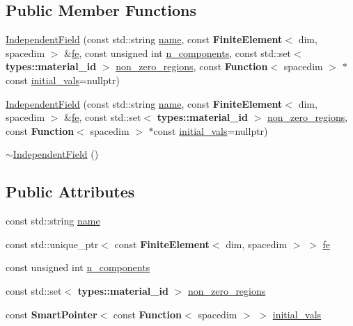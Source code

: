 \subsection*{Public Member Functions}
\begin{DoxyCompactItemize}
\item 
\hyperlink{class_independent_field_a03c2bec3886170c288c59381886afd90}{Independent\+Field} (const std\+::string \hyperlink{class_independent_field_ae05f8565e4ce1a70b5b833555dc084b5}{name}, const {\bf Finite\+Element}$<$ dim, spacedim $>$ \&\hyperlink{class_independent_field_a1c583665b7710bd3b815b03ba026b6d3}{fe}, const unsigned int \hyperlink{class_independent_field_a7b19ea8c30d72cf27f05669de61f30a8}{n\+\_\+components}, const std\+::set$<$ {\bf types\+::material\+\_\+id} $>$ \hyperlink{class_independent_field_a4e09e114870c0b3761bc2e32916e5850}{non\+\_\+zero\+\_\+regions}, const {\bf Function}$<$ spacedim $>$ $\ast$const \hyperlink{class_independent_field_a274c902785d2937a6065f7e09f3976c3}{initial\+\_\+vals}=nullptr)
\item 
\hyperlink{class_independent_field_af953c9ecc5965d5bcbd61fab9e0b6e2b}{Independent\+Field} (const std\+::string \hyperlink{class_independent_field_ae05f8565e4ce1a70b5b833555dc084b5}{name}, const {\bf Finite\+Element}$<$ dim, spacedim $>$ \&\hyperlink{class_independent_field_a1c583665b7710bd3b815b03ba026b6d3}{fe}, const std\+::set$<$ {\bf types\+::material\+\_\+id} $>$ \hyperlink{class_independent_field_a4e09e114870c0b3761bc2e32916e5850}{non\+\_\+zero\+\_\+regions}, const {\bf Function}$<$ spacedim $>$ $\ast$const \hyperlink{class_independent_field_a274c902785d2937a6065f7e09f3976c3}{initial\+\_\+vals}=nullptr)
\item 
\hyperlink{class_independent_field_af83ee8c1600bb079a3075244a7b39481}{$\sim$\+Independent\+Field} ()
\end{DoxyCompactItemize}
\subsection*{Public Attributes}
\begin{DoxyCompactItemize}
\item 
const std\+::string \hyperlink{class_independent_field_ae05f8565e4ce1a70b5b833555dc084b5}{name}
\item 
const std\+::unique\+\_\+ptr$<$ const {\bf Finite\+Element}$<$ dim, spacedim $>$ $>$ \hyperlink{class_independent_field_a1c583665b7710bd3b815b03ba026b6d3}{fe}
\item 
const unsigned int \hyperlink{class_independent_field_a7b19ea8c30d72cf27f05669de61f30a8}{n\+\_\+components}
\item 
const std\+::set$<$ {\bf types\+::material\+\_\+id} $>$ \hyperlink{class_independent_field_a4e09e114870c0b3761bc2e32916e5850}{non\+\_\+zero\+\_\+regions}
\item 
const {\bf Smart\+Pointer}$<$ const {\bf Function}$<$ spacedim $>$ $>$ \hyperlink{class_independent_field_a274c902785d2937a6065f7e09f3976c3}{initial\+\_\+vals}
\end{DoxyCompactItemize}
